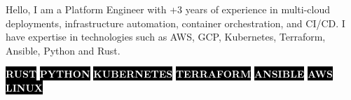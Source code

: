 \documentclass[10pt]{developercv} %
\begin{document}
\vspace{0.5cm}



\hspace{6pt}\begin{minipage}[t]{0.98\textwidth} %
	\vspace{-\baselineskip} %

	{Hello, I am a Platform Engineer with +3 years of experience in multi-cloud deployments, infrastructure automation, container orchestration, and CI/CD. I have expertise in technologies such as AWS, GCP, Kubernetes, Terraform, Ansible, Python and Rust.} %

\end{minipage}
\hfill %



\begin{center}
	\colorbox{black}{{\textcolor{white}{\textbf{\MakeUppercase{Rust}}}}}
	\colorbox{black}{{\textcolor{white}{\textbf{\MakeUppercase{Python}}}}}
	\colorbox{black}{{\textcolor{white}{\textbf{\MakeUppercase{Kubernetes}}}}}
	\colorbox{black}{{\textcolor{white}{\textbf{\MakeUppercase{Terraform}}}}}
	\colorbox{black}{{\textcolor{white}{\textbf{\MakeUppercase{Ansible}}}}}
	\colorbox{black}{{\textcolor{white}{\textbf{\MakeUppercase{AWS}}}}}
	\colorbox{black}{{\textcolor{white}{\textbf{\MakeUppercase{Linux}}}}}
\end{center}


\end{document}
